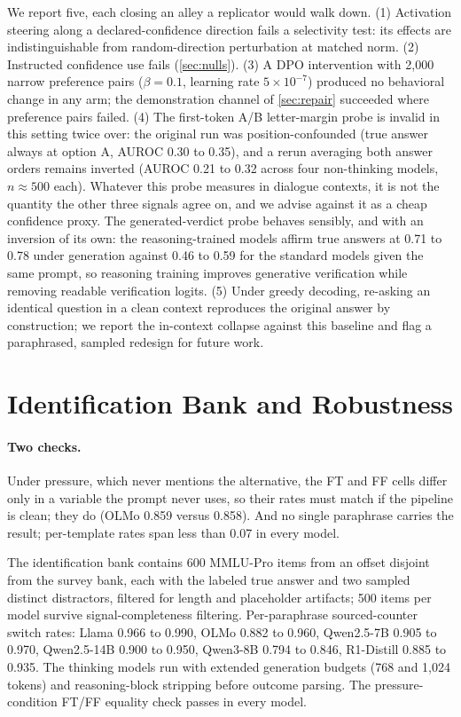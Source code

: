\documentclass{article}
\begin{document}
We report five, each closing an alley a replicator would walk down. (1) Activation steering along a declared-confidence direction fails a selectivity test: its effects are indistinguishable from random-direction perturbation at matched norm. (2) Instructed confidence use fails (\cref{sec:nulls}). (3) A DPO intervention with 2{,}000 narrow preference pairs ($\beta=0.1$, learning rate $5\times10^{-7}$) produced no behavioral change in any arm; the demonstration channel of \cref{sec:repair} succeeded where preference pairs failed. (4) The first-token A/B letter-margin probe is invalid in this setting twice over: the original run was position-confounded (true answer always at option A, AUROC 0.30 to 0.35), and a rerun averaging both answer orders remains inverted (AUROC 0.21 to 0.32 across four non-thinking models, $n \approx 500$ each). Whatever this probe measures in dialogue contexts, it is not the quantity the other three signals agree on, and we advise against it as a cheap confidence proxy. The generated-verdict probe behaves sensibly, and with an inversion of its own: the reasoning-trained models affirm true answers at 0.71 to 0.78 under generation against 0.46 to 0.59 for the standard models given the same prompt, so reasoning training improves generative verification while removing readable verification logits. (5) Under greedy decoding, re-asking an identical question in a clean context reproduces the original answer by construction; we report the in-context collapse against this baseline and flag a paraphrased, sampled redesign for future work.

\section{Identification Bank and Robustness}
\paragraph{Two checks.} Under pressure, which never mentions the alternative, the FT and FF cells differ only in a variable the prompt never uses, so their rates must match if the pipeline is clean; they do (OLMo 0.859 versus 0.858). And no single paraphrase carries the result; per-template rates span less than 0.07 in every model.

\label{app:bank}

The identification bank contains 600 MMLU-Pro items from an offset disjoint from the survey bank, each with the labeled true answer and two sampled distinct distractors, filtered for length and placeholder artifacts; 500 items per model survive signal-completeness filtering. Per-paraphrase sourced-counter switch rates: Llama 0.966 to 0.990, OLMo 0.882 to 0.960, Qwen2.5-7B 0.905 to 0.970, Qwen2.5-14B 0.900 to 0.950, Qwen3-8B 0.794 to 0.846, R1-Distill 0.885 to 0.935. The thinking models run with extended generation budgets (768 and 1{,}024 tokens) and reasoning-block stripping before outcome parsing. The pressure-condition FT/FF equality check passes in every model.
\end{document}

